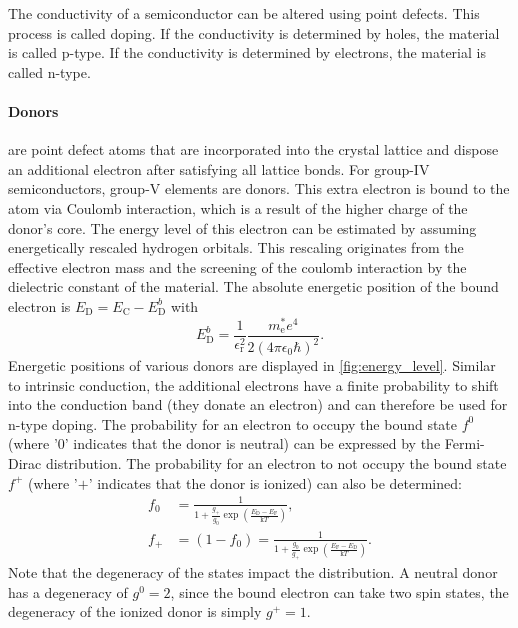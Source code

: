 The conductivity of a semiconductor can be altered using
point defects.
This process is called doping.
If the conductivity is determined by holes, the material is
called p-type.
If the conductivity is determined by electrons, the material
is called n-type.

\paragraph{Donors} are point defect atoms that are incorporated into the crystal
lattice and dispose an additional electron after satisfying all
lattice bonds.
For group-$\mathrm{IV}$ semiconductors, group-$\mathrm{V}$ elements
are donors.
This extra electron is bound to the atom via Coulomb interaction,
which is a result of the higher charge of the donor's core.
The energy level of this electron can be estimated by assuming
energetically rescaled hydrogen orbitals.
This rescaling originates from the effective electron mass and
the screening of the coulomb interaction by the dielectric constant
of the material.
The absolute energetic position of the bound electron is
$E_{\mathrm{D}}=E_{\mathrm{C}}-E_{\mathrm{D}}^{b}$ with
\begin{equation}
	E_{\mathrm{D}}^{b}=
	\frac{1}{\epsilon_{\mathrm{r}}^{2}}
	\frac{m_{\mathrm{e}}^{*} e^{4}}{2(4\pi\epsilon_{0}\hbar)^{2}}.
\end{equation}
Energetic positions of various donors are displayed in
\cref{fig:energy_level}.
Similar to intrinsic conduction, the additional electrons have a
finite probability to shift into the conduction band
(they donate an electron) and
can therefore be used for n-type doping.
The probability for an electron to occupy the bound state $f^0$
(where '$0$' indicates that the donor is neutral) can be expressed
by the Fermi-Dirac distribution.
The probability for an electron to not occupy the bound state $f^+$
(where '$+$' indicates that the donor is ionized) can also be
determined:
\begin{align}
	f_{0} & =\frac{1}{1+\frac{g_{+}}{g_{0}}\exp\left(
	\frac{E_{\mathrm{D}}-E_{\mathrm{F}}}{\mathrm{k}T}\right)},  \\
	\label{eq:fplus}
	f_{+} & =(1-f_{0})=\frac{1}{1+\frac{g_{0}}{g_{+}}\exp\left(
		\frac{E_{\mathrm{F}}-E_{\mathrm{D}}}{\mathrm{k}T} \right)}.
\end{align}
Note that the degeneracy of the states impact the distribution.
A neutral donor has a degeneracy of $g^0=2$, since the bound
electron can take two spin states, the degeneracy of the
ionized donor is simply $g^+=1$.

